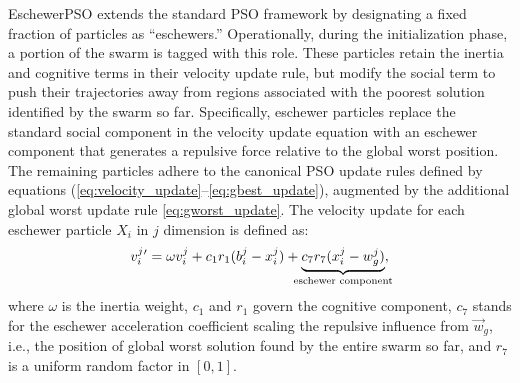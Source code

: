 {EschewerPSO extends the standard PSO framework by designating a fixed fraction of particles as ``eschewers.'' Operationally, during the initialization phase, a portion of the swarm is tagged with this role. These particles retain the inertia and cognitive terms in their velocity update rule, but modify the social term to push their trajectories away from regions associated with the poorest solution identified by the swarm so far.
Specifically, eschewer particles replace the standard social component in the velocity update equation with an eschewer component that generates a repulsive force relative to the global worst position. The remaining particles adhere to the canonical PSO update rules defined by equations (\ref{eq:velocity_update}–\ref{eq:gbest_update}), augmented by the additional global worst update rule \eqref{eq:gworst_update}. 
The velocity update for each eschewer particle $X_i$ in $j$ dimension is defined as:
\begin{equation}\label{eq:velocity_update_eschewer}
v_{i}^{j}{}' = \omega v_{i}^{j} +
c_1 r_1 (b_{i}^{j} - x_{i}^{j}) +
\underbrace{c_7 r_7 (x_{i}^{j} - w_{g}^{j})}_{\mathclap{\text{eschewer component}}},
\end{equation}
where
$\omega$ is the inertia weight, $c_1$ and $r_1$ govern the cognitive component, $c_7$ stands for the eschewer acceleration coefficient scaling the repulsive influence from $\vec{w}_g$, i.e., the position of global worst solution found by the entire swarm so far, and $r_7$ is a uniform random factor in $[0, 1]$.



\begin{figure}[H]
    \centering
\end{figure}}
